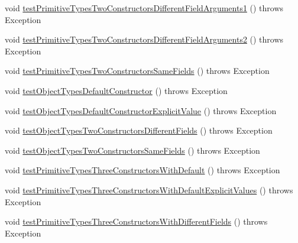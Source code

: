 \begin{DoxyCompactItemize}
\item 
void \hyperlink{classedu_1_1illinois_1_1canistelCassabanana_1_1tests_1_1RemoveDuplicateCodeInConstructorsRefactoringTests_a01a7a7709e1c81cea238ed806ad9892c}{testPrimitiveTypesTwoConstructorsDifferentFieldArguments1} ()  throws Exception 
\item 
void \hyperlink{classedu_1_1illinois_1_1canistelCassabanana_1_1tests_1_1RemoveDuplicateCodeInConstructorsRefactoringTests_a5c291d0b712ef123de50c1132fa693f0}{testPrimitiveTypesTwoConstructorsDifferentFieldArguments2} ()  throws Exception 
\item 
void \hyperlink{classedu_1_1illinois_1_1canistelCassabanana_1_1tests_1_1RemoveDuplicateCodeInConstructorsRefactoringTests_ae79f13f3640f121395007addcb3173f9}{testPrimitiveTypesTwoConstructorsSameFields} ()  throws Exception 
\item 
void \hyperlink{classedu_1_1illinois_1_1canistelCassabanana_1_1tests_1_1RemoveDuplicateCodeInConstructorsRefactoringTests_a7e7f8fa5d4dfa38b8326fe8bb4392d30}{testObjectTypesDefaultConstructor} ()  throws Exception 
\item 
void \hyperlink{classedu_1_1illinois_1_1canistelCassabanana_1_1tests_1_1RemoveDuplicateCodeInConstructorsRefactoringTests_a5c865ff48e95c5ff0e3571307c4d8e0c}{testObjectTypesDefaultConstructorExplicitValue} ()  throws Exception 
\item 
void \hyperlink{classedu_1_1illinois_1_1canistelCassabanana_1_1tests_1_1RemoveDuplicateCodeInConstructorsRefactoringTests_a7b0e4fde9afd24ca690fc56c68299d74}{testObjectTypesTwoConstructorsDifferentFields} ()  throws Exception 
\item 
void \hyperlink{classedu_1_1illinois_1_1canistelCassabanana_1_1tests_1_1RemoveDuplicateCodeInConstructorsRefactoringTests_a2ac2c56aa3d36dd75109edf84f023eda}{testObjectTypesTwoConstructorsSameFields} ()  throws Exception 
\item 
void \hyperlink{classedu_1_1illinois_1_1canistelCassabanana_1_1tests_1_1RemoveDuplicateCodeInConstructorsRefactoringTests_ac099b3ad06074f701948d67aae6155fd}{testPrimitiveTypesThreeConstructorsWithDefault} ()  throws Exception 
\item 
void \hyperlink{classedu_1_1illinois_1_1canistelCassabanana_1_1tests_1_1RemoveDuplicateCodeInConstructorsRefactoringTests_a05a24d38213f7cc86b2b6dc178326e3f}{testPrimitiveTypesThreeConstructorsWithDefaultExplicitValues} ()  throws Exception 
\item 
void \hyperlink{classedu_1_1illinois_1_1canistelCassabanana_1_1tests_1_1RemoveDuplicateCodeInConstructorsRefactoringTests_a0e9c7f96bb34c6a6c483b954bd035ec9}{testPrimitiveTypesThreeConstructorsWithDifferentFields} ()  throws Exception 

\end{DoxyCompactItemize}

